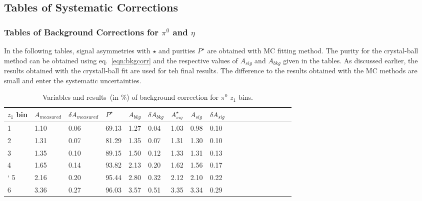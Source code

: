\subsection{Tables of Systematic Corrections}
\subsubsection{\texorpdfstring{Tables of Background Corrections for $\pi^0$ and $\eta$}{Tables of Background Correction for pi0 and eta}}

In the following tables, signal asymmetries with $\star$ and purities $P^{\star}$ are obtained with MC fitting method. The purity for the crystal-ball method can be obtained using eq.~\ref{eqn:bkgcorr} and the respective values of $ A_{sig}$ and  $A_{bkg}$ given in the tables. As discussed earlier, the results obtained with the crystall-ball fit are used for teh final results. The difference to the results obtained with the MC methods are small and enter the systematic uncertainties.
\begin{table}[H]\footnotesize
\centering
\begin{tabular}{|l|l|l|l|l|l|l|l|l|l|l|l|l|l|l|l|l|l|}
\\ \hline
$z_1$ bin & $A_{measured}$ & $\delta A_{measured}$ & $P^{\star}$ & $A_{bkg}$ & $\delta A_{bkg}$ & $A_{sig}^{\star}$ & $ A_{sig}$  & $\delta A_{sig}$ \\ \hline
1 & 1.10 & 0.06 & 69.13 & 1.27 & 0.04 & 1.03 & 0.98 & 0.10 \\ \hline 
2 & 1.31 & 0.07 & 81.29 & 1.35 & 0.07 & 1.31 & 1.30 & 0.10 \\ \hline 
3 & 1.35 & 0.10 & 89.15 & 1.50 & 0.12 & 1.33 & 1.31 & 0.13 \\ \hline 
4 & 1.65 & 0.14 & 93.82 & 2.13 & 0.20 & 1.62 & 1.56 & 0.17 \\ \hline `
5 & 2.16 & 0.20 & 95.44 & 2.80 & 0.32 & 2.12 & 2.10 & 0.22 \\ \hline 
6 & 3.36 & 0.27 & 96.03 & 3.57 & 0.51 & 3.35 & 3.34 & 0.29 \\ \hline 
\end{tabular}
\caption{Variables and results~(in $\%$) of background correction for $\pi^0$ $z_1$ bins. }
\label{tab:sinzbkgcor}
\end{table}

